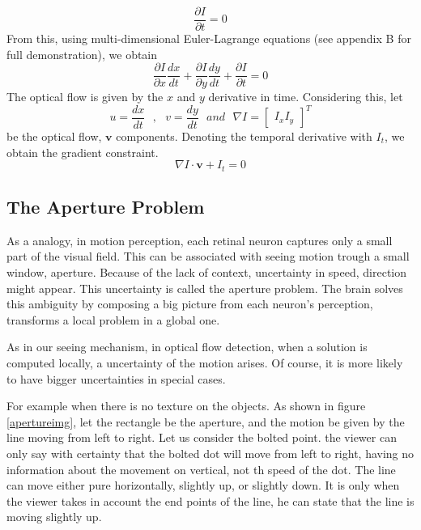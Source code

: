 \documentclass[12pt,a4paper,twoside]{report}
\begin{document}
\begin{equation}  \label{Idt0}
\frac{\partial I}{\partial t} = 0
\end{equation}
From this, using multi-dimensional Euler-Lagrange equations (see appendix B for full demonstration), we obtain
\begin{equation} \label{Idt0_lagr}
\frac{\partial I}{\partial x}\frac{dx}{dt} +
\frac{\partial I}{\partial y}\frac{dy}{dt} +
\frac{\partial I}{\partial t} = 0
\end{equation}
The optical flow is given by the $x$ and $y$ derivative in time. Considering this, let
\begin{equation}
u = \frac{dx}{dt} \ \ \ , \ \ \  v = \frac{dy}{dt} \ \ \ and \ \ \ \nabla I=\begin{bmatrix}
I_x I_y
\end{bmatrix} ^T
\end{equation} 
be the optical flow, $\boldsymbol{v}$ components. Denoting the temporal derivative with $I_t$, we obtain the gradient constraint. 
\begin{equation}
	\nabla I \cdot \boldsymbol{v}+I_t = 0
\end{equation}


\subsection{The Aperture Problem}
As a analogy, in motion perception, each retinal neuron captures only a small part of the visual field. This can be associated with seeing motion trough a small window, aperture. Because of the lack of context, uncertainty in speed, direction might appear. This uncertainty is called the aperture problem.
The brain solves this ambiguity by composing a big picture from each neuron's perception, transforms a local problem in a global one.
 
 
As in our seeing mechanism, in optical flow detection, when a solution is computed locally, a uncertainty of the motion arises. Of course, it is more likely to have bigger uncertainties in special cases. 

For example when there is no texture on the objects. As shown in figure \ref{apertureimg}, let the rectangle be the aperture, and the motion be given by the line moving from left to right. Let us consider the bolted point. the viewer can only say with certainty that the bolted dot will move from left to right, having no information about the movement on vertical, not th speed of the dot. The line can move either pure horizontally, slightly up, or slightly down. It is only when the viewer takes in account the end points of the line, he can state that the line is moving slightly up.  
\end{document}
